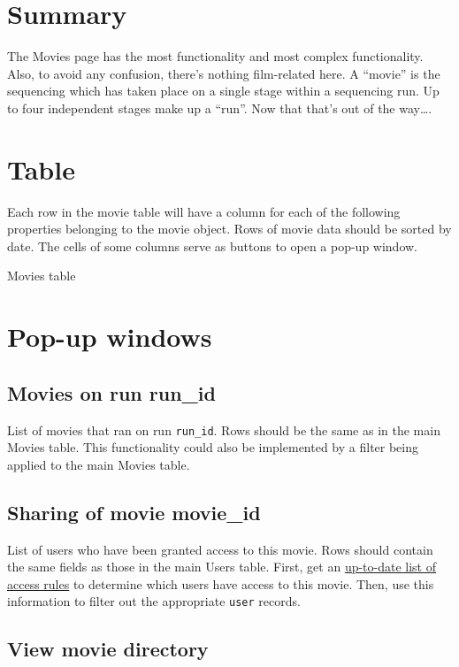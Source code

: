 
\section{Summary}
The Movies page has the most functionality and most complex functionality. Also, 
to avoid any confusion, there's nothing film-related here. A ``movie'' is the 
sequencing which has taken place on a single stage within a sequencing run. Up 
to four independent stages make up a ``run''. Now that that's out of the way….

\section{Table}
Each row in the movie table will have a column for each of the following properties 
belonging to the movie object. Rows of movie data should be sorted by date. The 
cells of some columns serve as buttons to open a pop-up window.

\begin{table}[h]
    
    \caption{Movies table}
\end{table}

\section{Pop-up windows}

\subsection{Movies on run run\_id}
List of movies that ran on run \texttt{run\_id}. Rows should be the same as in the main 
Movies table. This functionality could also be implemented by a filter being applied 
to the main Movies table.

\subsection{Sharing of movie movie\_id}
List of users who have been granted access to this movie. Rows should contain the 
same fields as those in the main Users table. First, get an 
\hyperref[section:updatingcollectionaccessrules]{up-to-date list of access rules} 
to determine which users have access to this movie. Then, use this information 
to filter out the appropriate \texttt{user} records.

\subsection{View movie directory}
